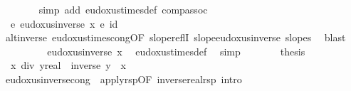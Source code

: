 \begin{isabellebody}
\ \ \ \ \ \ \isamarkupfalse%
\ {\isacharparenleft}{\kern0pt}simp\ add{\isacharcolon}{\kern0pt}\ eudoxus{\isacharunderscore}{\kern0pt}times{\isacharunderscore}{\kern0pt}def\ comp{\isacharunderscore}{\kern0pt}assoc{\isacharparenright}{\kern0pt}\ \ \ \ \ \ \isanewline
\ \ \ \ \isamarkupfalse%
\ \isamarkupfalse%
\ {\isachardoublequoteopen}{\isachardot}{\kern0pt}{\isachardot}{\kern0pt}{\isachardot}{\kern0pt}\ {\isasymsim}\isactrlsub e\ eudoxus{\isacharunderscore}{\kern0pt}inverse\ x{\isacharprime}{\kern0pt}\ {\isacharasterisk}{\kern0pt}\isactrlsub e\ id{\isachardoublequoteclose}\ \isamarkupfalse%
\ alt{\isacharunderscore}{\kern0pt}inverse\ eudoxus{\isacharunderscore}{\kern0pt}times{\isacharunderscore}{\kern0pt}cong{\isacharbrackleft}{\kern0pt}OF\ slope{\isacharunderscore}{\kern0pt}reflI{\isacharbrackright}{\kern0pt}\ slope{\isacharunderscore}{\kern0pt}eudoxus{\isacharunderscore}{\kern0pt}inverse\ slopes\ \isamarkupfalse%
\ blast\isanewline
\ \ \ \ \isamarkupfalse%
\ \isamarkupfalse%
\ {\isachardoublequoteopen}{\isachardot}{\kern0pt}{\isachardot}{\kern0pt}{\isachardot}{\kern0pt}\ {\isacharequal}{\kern0pt}\ eudoxus{\isacharunderscore}{\kern0pt}inverse\ x{\isacharprime}{\kern0pt}{\isachardoublequoteclose}\ \isamarkupfalse%
\ eudoxus{\isacharunderscore}{\kern0pt}times{\isacharunderscore}{\kern0pt}def\ \isamarkupfalse%
\ simp\isanewline
\ \ \ \ \isamarkupfalse%
\ \isamarkupfalse%
\ {\isacharquery}{\kern0pt}thesis\ \isacommand{{\isachardot}{\kern0pt}}\isamarkupfalse%
\isanewline
\ \ \isamarkupfalse%
\isanewline
{}\isamarkupfalse%
%
\endisatagproof
{\isafoldproof}%
%
\isadelimproof
\isanewline
%
\endisadelimproof
\isanewline
{}\isamarkupfalse%
\ \isanewline
\ \ {\isachardoublequoteopen}x\ div\ {\isacharparenleft}{\kern0pt}y{\isacharcolon}{\kern0pt}{\isacharcolon}{\kern0pt}real{\isacharparenright}{\kern0pt}\ {\isacharequal}{\kern0pt}\ inverse\ y\ {\isacharasterisk}{\kern0pt}\ x{\isachardoublequoteclose}\isanewline
\isanewline
{}\isamarkupfalse%
%
\isadelimproof
\ %
\endisadelimproof
%
\isatagproof
\isacommand{{\isachardot}{\kern0pt}{\isachardot}{\kern0pt}}\isamarkupfalse%
%
\endisatagproof
{\isafoldproof}%
%
\isadelimproof
%
\endisadelimproof
\isanewline
{}\isamarkupfalse%
\isanewline
\isanewline
{}\isamarkupfalse%
\ eudoxus{\isacharunderscore}{\kern0pt}inverse{\isacharunderscore}{\kern0pt}cong\ {\isacharequal}{\kern0pt}\ apply{\isacharunderscore}{\kern0pt}rsp{\isacharprime}{\kern0pt}{\isacharbrackleft}{\kern0pt}OF\ inverse{\isacharunderscore}{\kern0pt}real{\isachardot}{\kern0pt}rsp{\isacharcomma}{\kern0pt}\ intro{\isacharbrackright}{\kern0pt}\isanewline

\end{isabellebody}
